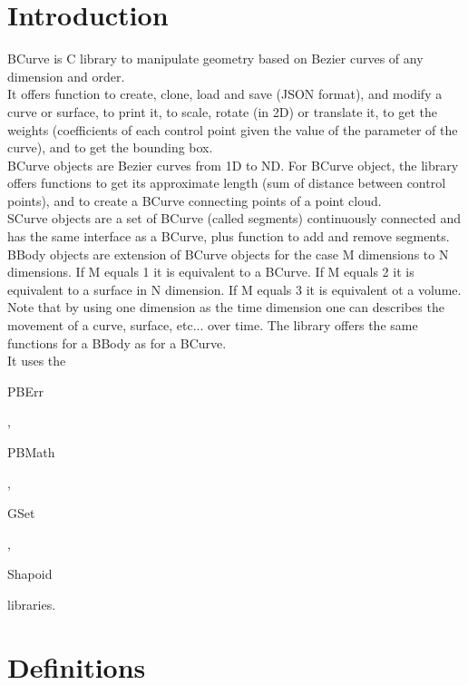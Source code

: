\section*{Introduction}

BCurve is C library to manipulate geometry based on Bezier curves of any dimension and order.\\ 

It offers function to create, clone, load and save (JSON format), and modify a curve or surface, to print it, to scale, rotate (in 2D) or translate it, to get the weights (coefficients of each control point given the value of the parameter of the curve), and to get the bounding box.\\ 

BCurve objects are Bezier curves from 1D to ND. For BCurve object, the library offers functions to get its approximate length (sum of distance between control points), and to create a BCurve connecting points of a point cloud.\\

SCurve objects are a set of BCurve (called segments) continuously connected and has the same interface as a BCurve, plus function to add and remove segments.\\

BBody objects are extension of BCurve objects for the case M dimensions to N dimensions. If M equals 1 it is equivalent to a BCurve. If M equals 2 it is equivalent to a surface in N dimension. If M equals 3 it is equivalent ot a volume. Note that by using one dimension as the time dimension one can describes the movement of a curve, surface, etc... over time. The library offers the same functions for a BBody as for a BCurve.\\ 

It uses the \begin{ttfamily}PBErr\end{ttfamily}, \begin{ttfamily}PBMath\end{ttfamily}, \begin{ttfamily}GSet\end{ttfamily}, \begin{ttfamily}Shapoid\end{ttfamily} libraries.\\

\section{Definitions}

